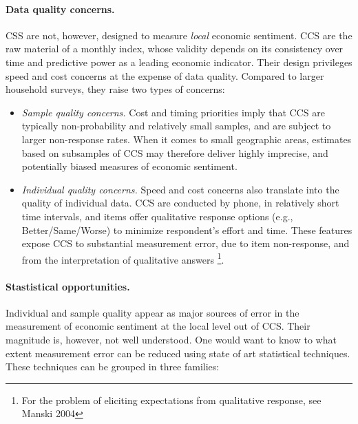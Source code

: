 \documentclass[12pt]{article}
\begin{document}
\paragraph{Data quality concerns.} CSS are not, however, designed to measure \textit{local} economic sentiment. CCS are the raw material of a monthly index, whose validity depends on its consistency over time and predictive power as a leading economic indicator. Their design privileges speed and cost concerns at the expense of data quality. Compared to larger household surveys, they raise two types of concerns:

\begin{itemize}
\item \emph{Sample quality concerns.} Cost and timing priorities imply that CCS are typically non-probability and relatively small samples, and are subject to larger non-response rates. When it comes to small geographic areas, estimates based on subsamples of CCS may therefore deliver highly imprecise, and potentially biased measures of  economic sentiment.
\item \emph{Individual quality concerns.} Speed and cost concerns also translate into the quality of individual data. CCS are conducted by phone, in relatively short time intervals, and items offer qualitative response options (e.g., Better/Same/Worse) to minimize respondent's effort and time. These features expose CCS to substantial measurement error, due to item non-response, and from the interpretation of qualitative answers \footnote{For the problem of eliciting expectations from qualitative response, see Manski 2004}.
\end{itemize}

\paragraph{Stastistical opportunities.} Individual and sample quality appear as major sources of error in the measurement of economic sentiment at the local level out of CCS. Their magnitude is, however, not well understood. One would want to know to what extent measurement error can be reduced using state of art statistical techniques. These techniques can be grouped in three families:
\end{document}
